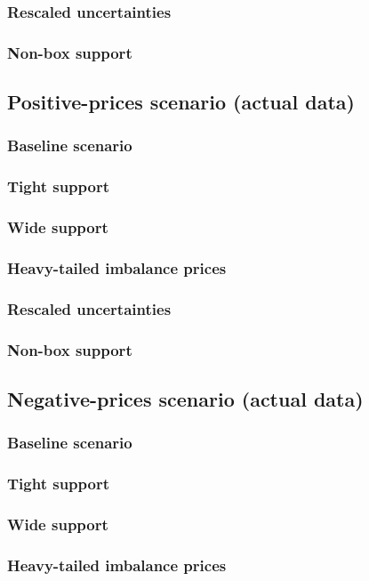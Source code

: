 \documentclass[11pt]{article}
\theoremstyle{plain}
\theoremstyle{definition}
\begin{document}
\subsubsection{Rescaled uncertainties}
\subsubsection{Non-box support}
\subsection{Positive-prices scenario (actual data)}
\subsubsection{Baseline scenario}
\subsubsection{Tight support}
\subsubsection{Wide support}
\subsubsection{Heavy-tailed imbalance prices}
\subsubsection{Rescaled uncertainties}
\subsubsection{Non-box support}
\subsection{Negative-prices scenario (actual data)}
\subsubsection{Baseline scenario}
\subsubsection{Tight support}
\subsubsection{Wide support}
\subsubsection{Heavy-tailed imbalance prices}
\end{document}
